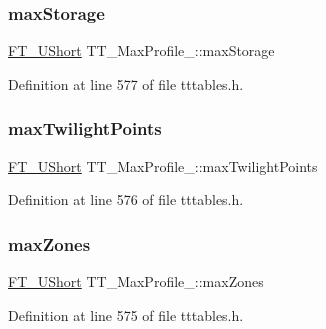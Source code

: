 \mbox{\label{struct_t_t___max_profile___a502a8579e3d358f3c00776ed0cc8a168}} 
\subsubsection{\texorpdfstring{maxStorage}{maxStorage}}
{\footnotesize\ttfamily \mbox{\hyperlink{fttypes_8h_a937f6c17cf5ffd09086d8610c37b9f58}{F\+T\+\_\+\+U\+Short}} T\+T\+\_\+\+Max\+Profile\+\_\+\+::max\+Storage}



Definition at line 577 of file tttables.\+h.

\mbox{\label{struct_t_t___max_profile___a907e28d69ad5e2a2c446e3eae8301af2}} 
\subsubsection{\texorpdfstring{maxTwilightPoints}{maxTwilightPoints}}
{\footnotesize\ttfamily \mbox{\hyperlink{fttypes_8h_a937f6c17cf5ffd09086d8610c37b9f58}{F\+T\+\_\+\+U\+Short}} T\+T\+\_\+\+Max\+Profile\+\_\+\+::max\+Twilight\+Points}



Definition at line 576 of file tttables.\+h.

\mbox{\label{struct_t_t___max_profile___a07213312ec7b821a53a17d90930a478a}} 
\subsubsection{\texorpdfstring{maxZones}{maxZones}}
{\footnotesize\ttfamily \mbox{\hyperlink{fttypes_8h_a937f6c17cf5ffd09086d8610c37b9f58}{F\+T\+\_\+\+U\+Short}} T\+T\+\_\+\+Max\+Profile\+\_\+\+::max\+Zones}



Definition at line 575 of file tttables.\+h.

\mbox{\label{struct_t_t___max_profile___a6ec14b34978f24173d50ab556613ade5}} 
